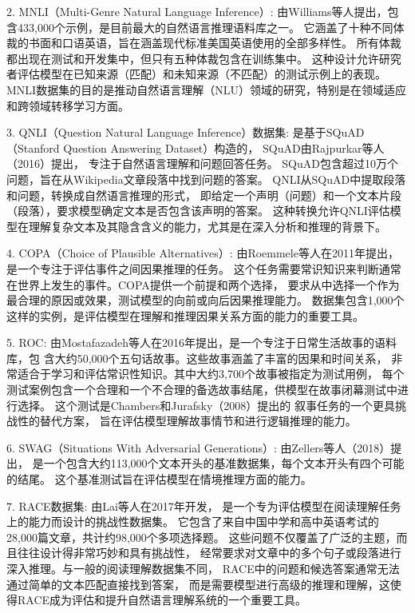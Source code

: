 2. MNLI（Multi-Genre Natural Language Inference）: 
由Williams等人提出\cite{williams2018broad}，包含433,000个示例，是目前最大的自然语言推理语料库之一。
它涵盖了十种不同体裁的书面和口语英语，旨在涵盖现代标准美国英语使用的全部多样性。
所有体裁都出现在测试和开发集中，但只有五种体裁包含在训练集中。
这种设计允许研究者评估模型在已知来源（匹配）和未知来源（不匹配）的测试示例上的表现。
MNLI数据集的目的是推动自然语言理解（NLU）领域的研究，特别是在领域适应和跨领域转移学习方面。

3. QNLI（Question Natural Language Inference）数据集\cite{wang2018glue}: 
是基于SQuAD（Stanford Question Answering Dataset）\cite{rajpurkar2016squad}构造的，
SQuAD由Rajpurkar等人（2016）提出，
专注于自然语言理解和问题回答任务。
SQuAD包含超过10万个问题，旨在从Wikipedia文章段落中找到问题的答案。
QNLI从SQuAD中提取段落和问题，转换成自然语言推理的形式，
即给定一个声明（问题）和一个文本片段（段落），要求模型确定文本是否包含该声明的答案。
这种转换允许QNLI评估模型在理解复杂文本及其隐含含义的能力，尤其是在深入分析和推理的背景下。

4. COPA（Choice of Plausible Alternatives）\cite{roemmele2011choice}: 由Roemmele等人在2011年提出，是一个专注于评估事件之间因果推理的任务。
这个任务需要常识知识来判断通常在世界上发生的事件。COPA提供一个前提和两个选择，
要求从中选择一个作为最合理的原因或效果，测试模型的向前或向后因果推理能力。
数据集包含1,000个这样的实例，是评估模型在理解和推理因果关系方面的能力的重要工具。

5. ROC\cite{mostafazadeh2016corpus}: 由Mostafazadeh等人在2016年提出，是一个专注于日常生活故事的语料库，包
含大约50,000个五句话故事。这些故事涵盖了丰富的因果和时间关系，
非常适合于学习和评估常识性知识。其中大约3,700个故事被指定为测试用例，
每个测试案例包含一个合理和一个不合理的备选故事结尾，供模型在故事闭幕测试中进行选择。
这个测试是Chambers和Jurafsky（2008）提出的
叙事任务\cite{chambers2008unsupervised}的一个更具挑战性的替代方案，
旨在评估模型理解故事情节和进行逻辑推理的能力。

6. SWAG（Situations With Adversarial Generations）\cite{zellers2018swag}: 由Zellers等人（2018）提出，
是一个包含大约113,000个文本开头的基准数据集，每个文本开头有四个可能的结尾。
这个基准测试旨在评估模型在情境推理方面的能力。

7. RACE数据集\cite{lai2017race}: 由Lai等人在2017年开发，
是一个专为评估模型在阅读理解任务上的能力而设计的挑战性数据集。
它包含了来自中国中学和高中英语考试的28,000篇文章，共计约98,000个多项选择题。
这些问题不仅覆盖了广泛的主题，而且往往设计得非常巧妙和具有挑战性，
经常要求对文章中的多个句子或段落进行深入推理。与一般的阅读理解数据集不同，
RACE中的问题和候选答案通常无法通过简单的文本匹配直接找到答案，
而是需要模型进行高级的推理和理解，这使得RACE成为评估和提升自然语言理解系统的一个重要工具。

